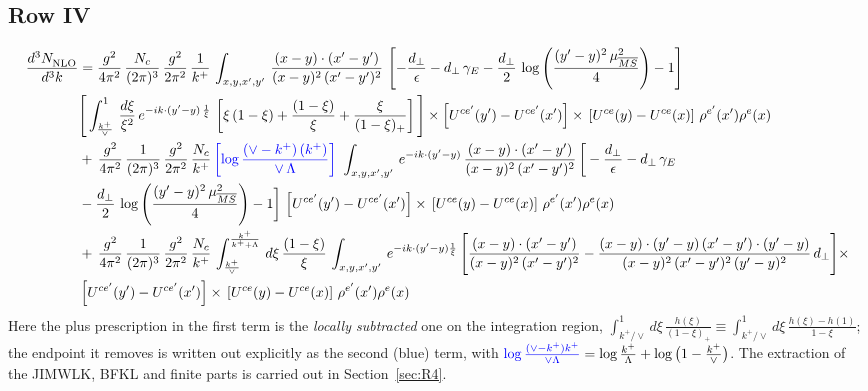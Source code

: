 \documentclass[9pt]{article}
\numberwithin{equation}{section}
\begin{document}
\subsection{Row IV}
\begin{align} \label{eq:R4start}
    \frac{d^{3}N_{\rm NLO}^{\rm}}{d^{3}k}  & = \frac{g^{2}}{4\pi^{2}}\, \frac{N_{c}}{(2\pi)^{3}}\,\frac{g^{2}}{2\pi^{2}}\, \frac{1}{k^{+}}\,\int_{x,y,x',y'}\,\frac{(x-y)\cdot (x'-y')}{(x-y)^{2}\,(x'-y')^{2}}\,\left[-\frac{d_{\perp}}{\epsilon}-d_{\perp}\,\gamma_{E}-\frac{d_{\perp}}{2}\,\log{\left(\frac{(y'-y)^{2}\,\mu^{2}_{\overline{MS}}}{4}\right)}-1\right]\,\notag \\ & \Bigg[\int_{\frac{k^{+}}{\vee}}^{1}\,\frac{d\xi}{\xi^{2}}\,e^{-ik\cdot (y'-y)\,\frac{1}{\xi}}\,\left[\xi\,(1-\xi)+\frac{(1-\xi)}{\xi}+\frac{\xi}{(1-\xi)_{+}}\right]\Bigg]\times \left[U^{ce'}(y') - U^{ce'}(x')\right] \times\, \left[U^{ce}(y) - U^{ce}(x)\right]\, \rho^{e'}(x') \rho^{e}(x)\notag \\ &  +\, \frac{g^{2}}{4\pi^{2}}\, \frac{1}{(2\pi)^{3}}\,\frac{g^{2}}{2\pi^{2}}\, \frac{N_{c}}{k^{+}}\,{\color{blue}\left[\log{\frac{(\vee - k^{+})\, (k^{+})}{\vee\,\Lambda}}\right]}\,\,\int_{x,y,x',y'}\,e^{-ik\cdot (y'-y)}\,\frac{(x-y)\cdot (x'-y')}{(x-y)^{2}\,(x'-y')^{2}}\,\bigg[-\frac{d_{\perp}}{\epsilon}-d_{\perp}\,\gamma_{E}\notag \\ & -\frac{d_{\perp}}{2}\,\log{\left(\frac{(y'-y)^{2}\,\mu^{2}_{\overline{MS}}}{4}\right)}-1\bigg]\,\left[U^{ce'}(y') - U^{ce'}(x')\right] \times\, \left[U^{ce}(y) - U^{ce}(x)\right]\, \rho^{e'}(x') \rho^{e}(x)\notag \\ & +\,\frac{g^{2}}{4\pi^{2}}\, \frac{1}{(2\pi)^{3}}\,\frac{g^{2}}{2\pi^{2}}\, \frac{N_{c}}{k^{+}}\,\int_{\frac{k^{+}}{\vee}}^{\frac{k^{+}}{k^{+}+\Lambda}}\,d\xi\, \frac{(1-\xi)}{\xi}\, \int_{x,y,x',y'}\,e^{-ik\cdot (y'-y)\frac{1}{\xi}}\,\Bigg[\frac{(x-y)\cdot (x'-y')}{(x-y)^{2}\, (x'-y')^{2}} -\frac{(x-y)\cdot (y'-y)\, (x'-y')\cdot (y'-y)}{(x-y)^{2}\,(x'-y')^{2}\,(y'-y)^{2}}\,d_{\perp}\Bigg]\times\notag \\ &  \left[U^{ce'}(y') - U^{ce'}(x')\right] \times\, \left[U^{ce}(y) - U^{ce}(x)\right]\, \rho^{e'}(x') \rho^{e}(x)
\end{align}
Here the plus prescription in the first term is the \emph{locally subtracted} one on the integration region, $\int_{k^{+}/\vee}^{1}d\xi\,\frac{h(\xi)}{(1-\xi)_{+}}\equiv\int_{k^{+}/\vee}^{1}d\xi\,\frac{h(\xi)-h(1)}{1-\xi}$; the endpoint it removes is written out explicitly as the second (blue) term, with ${\color{blue}\log\frac{(\vee-k^{+})k^{+}}{\vee\Lambda}}=\log\frac{k^{+}}{\Lambda}+\log\big(1-\frac{k^{+}}{\vee}\big)$. The extraction of the JIMWLK, BFKL and finite parts is carried out in Section~\ref{sec:R4}.
\end{document}
